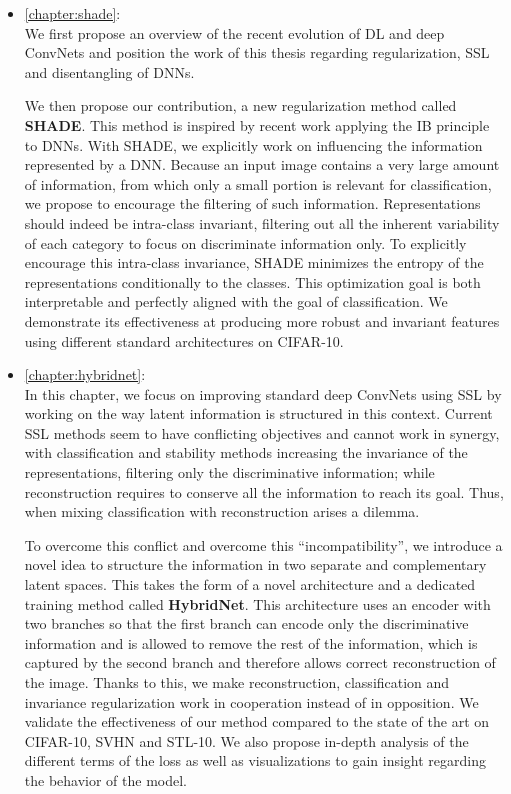 \begin{itemize}
	\item \autoref{chapter:shade}: \\
	We first propose an overview of the recent evolution of \ac{DL} and deep \acp{ConvNet} and position the work of this thesis regarding regularization, \ac{SSL} and disentangling of \acp{DNN}.

	We then propose our contribution, a new regularization method called \textbf{\acs{SHADE}}. This method is inspired by recent work applying the \ac{IB} principle to \acp{DNN}. With \acs{SHADE}, we explicitly work on influencing the information represented  by a \ac{DNN}. Because an input image contains a very large amount of information, from which only a small portion is relevant for classification, we propose to encourage the filtering of such information.
	Representations should indeed be intra-class invariant, filtering out all the inherent variability of each category to focus on discriminate information only. 
	To explicitly encourage this intra-class invariance, \acs{SHADE} minimizes the entropy of the representations conditionally to the classes. This optimization goal is both interpretable and perfectly aligned with the goal of classification. We demonstrate its effectiveness at producing more robust and invariant features using different standard architectures on CIFAR-10.


	\item \autoref{chapter:hybridnet}: \\
	In this chapter, we focus on improving standard deep \acp{ConvNet} using \acf{SSL} by working on the way latent information is structured in this context.
	Current \ac{SSL} methods seem to have conflicting objectives and cannot work in synergy, with classification and stability methods increasing the invariance of the representations, filtering only the discriminative information; while reconstruction requires to conserve all the information to reach its goal. Thus, when mixing classification with reconstruction arises a dilemma.
	
	To overcome this conflict and overcome this ``incompatibility'', we introduce a novel idea to structure the information in two separate and complementary latent spaces. This takes the form of a novel architecture and a dedicated training method called \textbf{HybridNet}. This architecture uses an encoder with two branches so that the first branch can encode only the discriminative information and is allowed to remove the rest of the information, which is captured by the second branch and therefore allows correct reconstruction of the image. Thanks to this, we make reconstruction, classification and invariance regularization work in cooperation instead of in opposition. We validate the effectiveness of our method compared to the state of the art on CIFAR-10, SVHN and STL-10. We also propose in-depth analysis of the different terms of the loss as well as visualizations to gain insight regarding the behavior of the model.



\end{itemize}
